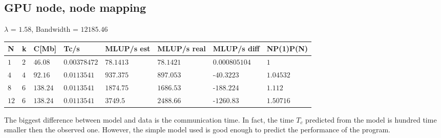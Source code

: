\documentclass[11pt,a4paper]{article}
\begin{document}
\subsection*{GPU node, node mapping}
$\lambda$ = $1.58$, Bandwidth = $12185.46$
\begin{table}[H]
    \centering
    \begin{tabular}{|l|l|l|l|l|l|l|l|}
    \toprule
    N 		& k 	& C[Mb] 	& Tc/s 			& MLUP/s est 	& MLUP/s real 	& MLUP/s diff  & NP(1)P(N) \\
    \midrule
    $1$ 	& $2$ 	& $46.08$ 	& $0.00378472$ 	& $78.1413$ 	& $78.1421$ 	&$0.000805104$ & $1$ \\
    $4$ 	& $4$ 	& $92.16$ 	& $0.0113541$ 	& $937.375$ 	& $897.053$ 		&-$40.3223$ & $1.04532$ \\
    $8$ 	& $6$ 	& $138.24$ 	& $0.0113541$ 	& $1874.75$ 	& $1686.53$ 	&-$188.224$ & $1.112$ \\
    $12$ 	& $6$ 	& $138.24$ 	& $0.0113541$ 	& $3749.5$ 		& $2488.66$ 	&-$1260.83$ & $1.50716$ \\
    \bottomrule
    \end{tabular}
\end{table}
The biggest difference between model and data is the communication time. In fact, the time $T_c$ predicted from the model is hundred time smaller then the observed one. However, the simple model used is good enough to predict the performance of the program. 
\end{document}
